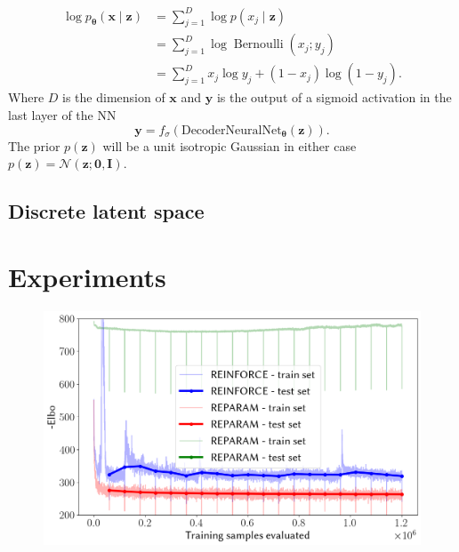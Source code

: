 \documentclass[final,3p,times,twocolumn]{elsarticle}
\begin{document}
\begin{equation}
	\label{eq:bernoulli}
	\begin{aligned} 
		\log p_{\boldsymbol{\theta}}(\mathbf{x} \mid \mathbf{z}) 
		&=\sum_{j=1}^{D} \log p\left(x_{j} \mid \mathbf{z}\right) \\ 
		&=\sum_{j=1}^{D} \log \operatorname{Bernoulli}\left(x_{j} ; y_{j}\right) \\ 
		&=\sum_{j=1}^{D} x_{j} \log y_{j}+\left(1-x_{j}\right) \log \left(1-y_{j}\right).
	\end{aligned}
\end{equation}
Where $D$ is the dimension of $\mathbf{x}$ and $\mathbf{y}$ is the output of a sigmoid activation in the last layer of the NN
\begin{equation}
	\mathbf{y}=f_{\sigma}\left(\text{DecoderNeuralNet}_{\boldsymbol{\theta}}(\mathbf{z})\right).
\end{equation}
The prior $p(\mathbf{z})$ will be a unit isotropic Gaussian in either case $p(\mathbf{z})=\mathcal{N}(\mathbf{z} ; \mathbf{0}, \mathbf{I})$. 

\subsection{Discrete latent space}
\label{subsec:discrete}




\section{Experiments}
\begin{figure}
	\centering
	\includegraphics[width=\linewidth]{../plots/fmnist_learning}
	\caption{}
	\label{fig:fmnistlearning}
\end{figure}
\end{document}
